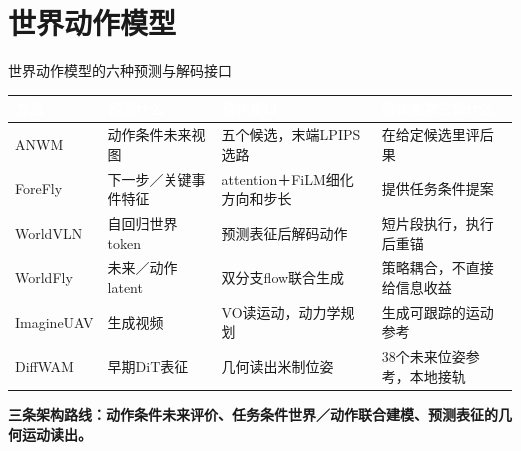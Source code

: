\documentclass[aspectratio=169,10pt]{beamer}
\def\slidesource{}
\newcommand{\takeaway}[1]{\par\begin{takebox}\fontsize{9.1}{11.5}\selectfont\bfseries\color{navy}#1\end{takebox}}
\newcommand{\thd}[1]{\textcolor{white}{\bfseries #1}}
\begin{document}
\section{世界动作模型}
\gdef\slidesource{原文依据：\href{https://arxiv.org/html/2512.21887v2}{[15] ANWM}；\href{https://arxiv.org/html/2609.33581v1}{[18] ForeFly}；\href{https://arxiv.org/html/2605.15964v1}{[16] WorldVLN}；\href{https://arxiv.org/html/2609.39763v1}{[20] DiffWAM}}
\begin{frame}[t,label=wam_interfaces]{世界动作模型的六种预测与解码接口}
\relax
{\fontsize{8.7}{11.1}\selectfont
{}
\begin{tabularx}{\linewidth}{@{}Y{0.6}Y{1.08}Y{1.12}Y{1.2}@{}}\toprule
{}\thd{方法} & \thd{预测什么} & \thd{动作接口} & \thd{群体能拿它做什么}\\\midrule
ANWM & 动作条件未来视图 & 五个候选，末端LPIPS选路 & 在给定候选里评后果\\
ForeFly & 下一步／关键事件特征 & attention＋FiLM细化方向和步长 & 提供任务条件提案\\
WorldVLN & 自回归世界token & 预测表征后解码动作 & 短片段执行，执行后重锚\\
WorldFly & 未来／动作latent & 双分支flow联合生成 & 策略耦合，不直接给信息收益\\
ImagineUAV & 生成视频 & VO读运动，动力学规划 & 生成可跟踪的运动参考\\
DiffWAM & 早期DiT表征 & 几何读出米制位姿 & 38个未来位姿参考，本地接轨\\
\bottomrule\end{tabularx}\par}
\takeaway{三条架构路线：动作条件未来评价、任务条件世界／动作联合建模、预测表征的几何运动读出。}

\end{frame}
\gdef\slidesource{\href{https://arxiv.org/html/2512.21887v2}{[15] ANWM} · §3.3–3.4；Figs.2–3；Table 2}
\end{document}
